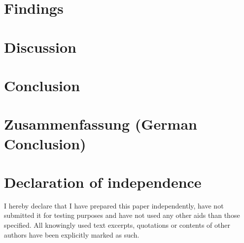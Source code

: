 \documentclass[12pt,a4paper,titlepage,oneside,abstract=true,toc=listof,toc=bibliography]{scrreprt}
\begin{document}
	
	
\chapter{Findings}

\chapter{Discussion}

\chapter{Conclusion}

\chapter{Zusammenfassung (German Conclusion)}

 
\cleardoublepage			

\chapter*{Declaration of independence}
I hereby declare that I have prepared this paper independently, have not submitted it for testing purposes and have not used any other aids than those specified. All knowingly used text excerpts, quotations or contents of other authors have been explicitly marked as such. \\[2ex]
\end{document}
